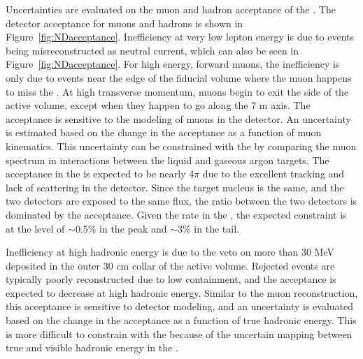 Uncertainties are evaluated on the muon and hadron acceptance of the . The detector acceptance for muons and hadrons is shown in Figure~\ref{fig:NDacceptance}. Inefficiency at very low lepton energy is due to events being misreconstructed as neutral current, which can also be seen in Figure~\ref{fig:NDacceptance}. For high energy, forward muons, the inefficiency is only due to events near the edge of the fiducial volume where the muon happens to miss the . At high transverse momentum, muons begin to exit the side of the  active volume, except when they happen to go along the 7 m axis. The acceptance is sensitive to the modeling of muons in the detector. An uncertainty is estimated based on the change in the acceptance as a function of muon kinematics. This uncertainty can be constrained with the  by comparing the muon spectrum in  interactions between the liquid and gaseous argon targets. The acceptance in the  is expected to be nearly 4$\pi$ due to the excellent tracking and lack of scattering in the detector. Since the target nucleus is the same, and the two detectors are exposed to the same flux, the ratio between the two detectors is dominated by the  acceptance. Given the rate in the , the expected constraint is at the level of $\sim$0.5\% in the peak and $\sim$3\% in the tail.

Inefficiency at high hadronic energy is due to the veto on more than 30 MeV deposited in the outer 30 cm collar of the active volume. Rejected events are typically poorly reconstructed due to low containment, and the acceptance is expected to decrease at high hadronic energy. Similar to the muon reconstruction, this acceptance is sensitive to detector modeling, and an uncertainty is evaluated based on the change in the acceptance as a function of true hadronic energy. This is more difficult to constrain with the  because of the uncertain mapping between true and visible hadronic energy in the .

